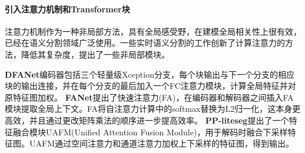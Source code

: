 \documentclass[11pt]{article}
\begin{document}
\paragraph{引入注意力机制和Transformer块}
注意力机制作为一种非局部方法，具有全局感受野，在建模全局相关性上很有效，已经在语义分割领域广泛使用。一些实时语义分割的工作创新了计算注意力的方法，降低其复杂度，提出了一些非局部模块。

\textbf{DFANet}\cite{ref26}编码器包括三个轻量级Xception分支，每个块输出与下一个分支的相应块的输出连接，并在每个分支的最后加入一个FC注意力模块，计算全局特征并对原特征图加权。
\textbf{FANet}\cite{ref27}提出了快速注意力(FA)，在编码器和解码器之间插入FA模块提取全局上下文。FA将自注意力计算中的softmax替换为L2归一化，这本身更高效，并且通过更改矩阵乘法的顺序进一步提高效率。
\textbf{PP-liteseg}\cite{ref28}提出了一个特征融合模块UAFM(Unified Attention Fusion Module)，用于解码时融合下采样特征图。UAFM通过空间注意力和通道注意力加权上下采样的特征图，得到输出。
\end{document}
